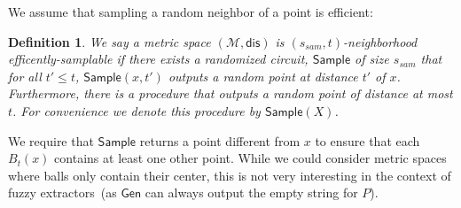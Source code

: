 \documentclass[11pt]{article}
\newcommand{\class}[1]{{\ensuremath{\mathsf{#1}}}}
\newcommand{\gen}{\ensuremath{\class{Gen}}\xspace}
\newcommand{\sample}{\ensuremath{\class{Sample}}\xspace}
\newcommand{\dis}{\ensuremath{\mathsf{dis}}}
\newtheorem{lemma}[theorem]{Lemma}
\newtheorem{definition}[theorem]{Definition}
\begin{document}
We assume that sampling a random neighbor of a point is efficient:
\begin{definition}
We say a metric space $(\mathcal{M}, \dis)$ is $(s_{sam}, t)$-\emph{neighborhood efficently-samplable} if there exists a randomized circuit, $\sample$ of size $s_{sam}$ that for all $t'\leq t$, $\sample (x, t')$ outputs a random point at distance $t'$ of $x$.  
Furthermore, there is a procedure that outputs a random point of distance at most $t$.  For convenience we denote this procedure by $\sample(X)$.
\end{definition}
We require that \sample returns a point different from $x$ to ensure that each $B_t(x)$ contains at least one other point.  While we could consider metric spaces where balls only contain their center, this is not very interesting in the context of fuzzy extractors~(as \gen can always output the empty string for $P$).

%
%
\end{document}
